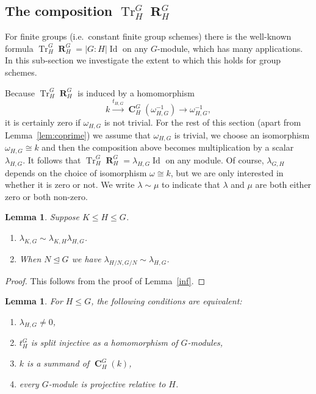 \documentclass[12pt]{amsart}
\newtheorem{lemma}[theorem]{Lemma}
\theoremstyle{definition}
\DeclareMathOperator{\coind}{\mathbf{C}}
\DeclareMathOperator{\res}{\mathbf{R}}
\DeclareMathOperator{\Tr}{Tr}
\DeclareMathOperator{\ide}{Id}
\begin{document}
\subsection{The composition $\Tr ^G_H \res^G_H$}\label{subsec:trres}
For finite groups (i.e.\ constant finite group schemes) there is the well-known formula $\Tr^G_H \res^G_H = |G{:}H| \ide$ on any $G$-module, which has many applications. In this sub-section we investigate the extent to which this holds for group schemes.

Because $\Tr^G_H \res^G_H$ is induced by a homomorphism 
\begin{equation}\label{e:Q1} k \xrightarrow{t_{H,G}} \coind^G_H (\omega_{H,G}^{-1}) \rightarrow \omega_{H,G}^{-1} ,\end{equation}
it is certainly zero if $\omega_{H,G}$ is not trivial. For the rest of this section (apart from Lemma~\ref{lem:coprime}) we assume that $\omega_{H,G}$ is trivial, we choose an isomorphism $\omega_{H,G} \cong k$ and then the composition above becomes multiplication by a scalar $\lambda_{H,G}$. It follows that $\Tr^G_H \res^G_H= \lambda_{H,G} \ide$ on any module. Of course, $\lambda_{G,H}$ depends on the choice of isomorphism $\omega \cong k$, but we are only interested in whether it is zero or not. We write $\lambda \sim \mu $ to indicate that $\lambda$ and $\mu$ are both either zero or both non-zero.


\begin{lemma}\label{l:Q1} Suppose $K \leq H \leq G$.
	\begin{enumerate} 
		\item 
		$\lambda _{K,G} \sim \lambda_{K,H} \lambda_{H,G}$.
	\item
	When $N \unlhd G$ we have $\lambda_{H/N,G/N} \sim \lambda_{H,G}$. 
	\end{enumerate}
\end{lemma}

\begin{proof} This follows from the proof of Lemma~\ref{inf}.
	\end{proof}
	
	\begin{lemma}\label{l:Q2}
		For $H \leq G$, the following conditions are equivalent:
		\begin{enumerate}
		 \item $\lambda_{H,G} \ne 0$,
			\item $t^G_H$ is split injective as a homomorphism of $G$-modules,
			\item $k$ is a summand of $\coind^G_H (k)$,
			\item every $G$-module is projective relative to $H$.
		\end{enumerate}
	\end{lemma}
	
\end{document}
